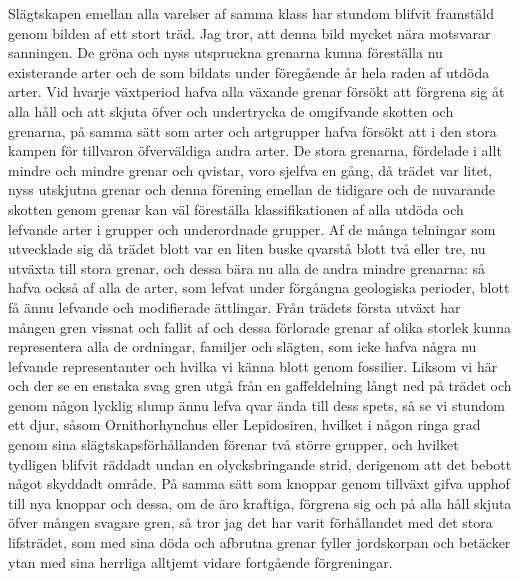 Slägtskapen emellan alla varelser af samma klass har stundom blifvit framstäld genom bilden af ett stort träd. Jag tror, att denna bild mycket nära motsvarar sanningen. De gröna och nyss utspruckna grenarna kunna föreställa nu existerande arter och de som bildats under föregående år hela raden af utdöda arter. Vid hvarje växtperiod hafva alla växande grenar försökt att förgrena sig åt alla håll och att skjuta öfver och undertrycka de omgifvande skotten och grenarna, på samma sätt som arter och artgrupper hafva försökt att i den stora kampen för tillvaron öfverväldiga andra arter. De stora grenarna, fördelade i allt mindre och mindre grenar och qvistar, voro sjelfva en gång, då trädet var litet, nyss utskjutna grenar och denna förening emellan de tidigare och de nuvarande skotten genom grenar kan väl föreställa klassifikationen af alla utdöda och lefvande arter i grupper och underordnade grupper. Af de många telningar som utvecklade sig då trädet blott var en liten buske qvarstå blott två eller tre, nu utväxta till stora grenar, och dessa bära nu alla de andra mindre grenarna: så hafva också af alla de arter, som lefvat under förgångna geologiska perioder, blott få ännu lefvande och modifierade ättlingar. Från trädets första utväxt har mången gren vissnat och fallit af och dessa förlorade grenar af olika storlek kunna representera alla de ordningar, familjer och slägten, som icke hafva några nu lefvande representanter och hvilka vi känna blott genom fossilier. Liksom vi här och der se en enstaka svag gren utgå från en gaffeldelning långt ned på trädet och genom någon lycklig slump ännu lefva qvar ända till dess spets, så se vi stundom ett djur, såsom Ornithorhynchus eller Lepidosiren, hvilket i någon ringa grad genom sina slägtskapsförhållanden förenar två större grupper, och hvilket tydligen blifvit räddadt undan en olycksbringande strid, derigenom att det bebott något skyddadt område. På samma sätt som knoppar genom tillväxt gifva upphof till nya knoppar och dessa, om de äro kraftiga, förgrena sig och på alla håll skjuta öfver mången svagare gren, så tror jag det har varit förhållandet med det stora lifsträdet, som med sina döda och afbrutna grenar fyller jordskorpan och betäcker ytan med sina herrliga alltjemt vidare fortgående förgreningar.


